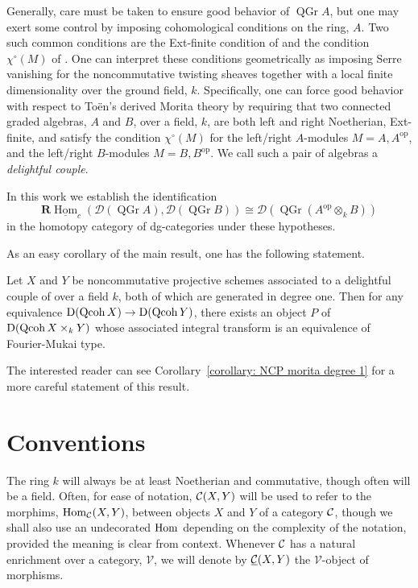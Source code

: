 Generally, care must be taken to ensure good behavior of \(\operatorname{QGr} A\), but one may exert some control by imposing cohomological conditions on the ring, \(A\).
Two such common conditions are the Ext-finite condition of \parencite{BVdB} and the condition \(\chi^\circ(M)\) of \parencite{AZ94}.
One can interpret these conditions geometrically as imposing Serre vanishing for the noncommutative twisting sheaves together with a local finite dimensionality over the ground field, \(k\).
Specifically, one can force good behavior with respect to To\"en's derived Morita theory by requiring that two connected graded algebras, \(A\) and \(B\), over a field, \(k\), are both left and right Noetherian, Ext-finite, and satisfy the condition \(\chi^\circ(M)\) for the left/right \(A\)-modules \(M = A, A^{\operatorname{op}}\), and the left/right \(B\)-modules \(M = B, B^{\operatorname{op}}\).
We call such a pair of algebras a \textit{delightful couple}.

In this work we establish the identification
\[\mathbf{R}\underline{\operatorname{Hom}}_c(\mathcal{D}(\operatorname{QGr} A), \mathcal{D}(\operatorname{QGr} B)) \cong \mathcal{D}(\operatorname{QGr}(A^{\operatorname{op}} \otimes_k B))\]
in the homotopy category of dg-categories under these hypotheses.

As an easy corollary of the main result, one has the following statement.
\begin{theorem}
  Let \(X\) and \(Y\) be noncommutative projective schemes associated to a delightful couple of over a field \(k\), both of which are generated in degree one.
  Then for any equivalence \(\mathrm{D}(\operatorname{Qcoh}X) \to \mathrm{D}(\operatorname{Qcoh}Y)\), there exists an object \(P\) of \(\mathrm{D}(\operatorname{Qcoh}X \times_k Y)\) whose associated integral transform is an equivalence of Fourier-Mukai type.
\end{theorem}

\noindent
The interested reader can see Corollary~\ref{corollary: NCP morita degree 1} for a more careful statement of this result.

\section*{Conventions}
The ring \(k\) will always be at least Noetherian and commutative, though often will be a field.
Often, for ease of notation, \(\mathcal{C}(X,Y)\) will be used to refer to the morphims, \(\operatorname{Hom}_{\mathcal{C}}(X,Y)\), between objects \(X\) and \(Y\) of a category \(\mathcal{C}\), though we shall also use an undecorated \(\operatorname{Hom}\) depending on the complexity of the notation, provided the meaning is clear from context. 
Whenever \(\mathcal{C}\) has a natural enrichment over a category, \(\mathcal{V}\), we will denote by \(\underline{\mathcal{C}}(X,Y)\) the \(\mathcal{V}\)-object of morphisms.

